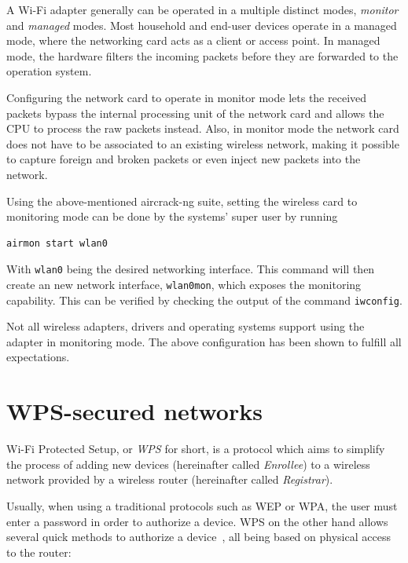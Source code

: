 A Wi-Fi adapter generally can be operated in a multiple distinct modes, \emph{monitor} and \emph{managed} modes. Most household and end-user devices operate in a managed mode, where the networking card acts as a client or access point. In managed mode, the hardware filters the incoming packets before they are forwarded to the operation system. 

Configuring the network card to operate in monitor mode lets the received packets bypass the internal processing unit of the network card and allows the CPU to process the raw packets instead. Also, in monitor mode the network card does not have to be associated to an existing wireless network, making it possible to capture foreign and broken packets or even inject new packets into the network.

Using the above-mentioned aircrack-ng suite, setting the wireless card to monitoring mode can be done by the systems' super user by running

\begin{lstlisting}[basicstyle=\ttfamily]
airmon start wlan0
\end{lstlisting}

With \lstinline[basicstyle=\ttfamily]{wlan0} being the desired networking interface. This command will then create an new network interface, \lstinline[basicstyle=\ttfamily]{wlan0mon}, which exposes the monitoring capability. This can be verified by checking the output of the command \lstinline[basicstyle=\ttfamily]{iwconfig}.

Not all wireless adapters, drivers and operating systems support using the adapter in monitoring mode. The above configuration has been shown to fulfill all expectations.

\section{WPS-secured networks}

Wi-Fi Protected Setup, or \emph{WPS} for short, is a protocol which aims to simplify the process of adding new devices (hereinafter called \emph{Enrollee}) to a wireless network provided by a wireless router (hereinafter called \emph{Registrar}). 

Usually, when using a traditional protocols such as WEP or WPA, the user must enter a password in order to authorize a device. WPS on the other hand allows several quick methods to authorize a device~\cite{WiFi11}, all being based on physical access to the router:

